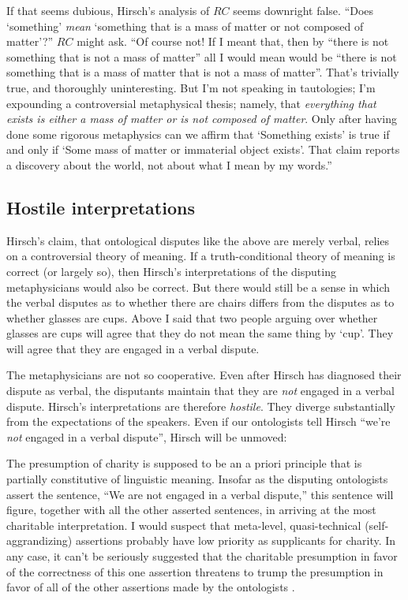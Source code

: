 \documentclass[11pt]{article}
\newenvironment{squote}{%
\begin{spacing}{1}
       	\begin{list}{}{%
\setlength{\labelwidth}{0pt}%
\rightmargin\leftmargin%
}
\item\relax
}{%
\end{list}%
\end{spacing}
}
\begin{document}
\begin{spacing}{1.25}
If that seems dubious, Hirsch's analysis of $RC$ seems downright
false.  ``Does `something' {\em mean} `something that is a mass of
matter or not composed of matter'?''  $RC$ might ask.  ``Of course
not!  If I meant that, then by ``there is not something that is not a
mass of matter'' all I would mean would be ``there is not something
that is a mass of matter that is not a mass of matter''.  That's
trivially true, and thoroughly uninteresting.  But I'm not speaking in
tautologies; I'm expounding a controversial metaphysical thesis;
namely, that {\em everything that exists is either a mass of matter or
  is not composed of matter}.  Only after having done some rigorous
metaphysics can we affirm that `Something exists' is true if and only
if `Some mass of matter or immaterial object exists'.  That claim
reports a discovery about the world, not about what I mean by my
words.''

\subsection{Hostile interpretations}
\label{hostile}
Hirsch's claim, that ontological disputes like the above are merely
verbal, relies on a controversial theory of meaning.  If a
truth-conditional theory of meaning is correct (or largely so), then
Hirsch's interpretations of the disputing metaphysicians would also be
correct.  But there would still be a sense in which the verbal
disputes as to whether there are chairs differs from the disputes as
to whether glasses are cups.  Above I said that two people arguing
over whether glasses are cups will agree that they do not mean the
same thing by `cup'.  They will agree that they are engaged in a
verbal dispute.

The metaphysicians are not so cooperative.  Even after Hirsch has
diagnosed their dispute as verbal, the disputants maintain that they
are {\em not} engaged in a verbal dispute.  Hirsch's interpretations
are therefore \emph{hostile}.  They diverge substantially from the
expectations of the speakers.  Even if our ontologists tell Hirsch
``we're \emph{not} engaged in a verbal dispute'', Hirsch will be
unmoved:

\begin{squote}
The presumption of charity is supposed to be an a priori principle
that is partially constitutive of linguistic meaning.  Insofar as the
disputing ontologists assert the sentence, ``We are not engaged in a
verbal dispute,'' this sentence will figure, together with all the
other asserted sentences, in arriving at the most charitable
interpretation.  I would suspect that meta-level, quasi-technical
(self-aggrandizing) assertions probably have low priority as
supplicants for charity.  In any case, it can't be seriously suggested
that the charitable presumption in favor of the correctness of this
one assertion threatens to trump the presumption in favor of all of
the other assertions made by the ontologists
\citeyearpar[515]{hirsch2008}.
\end{squote}


\end{spacing}
\end{document}
